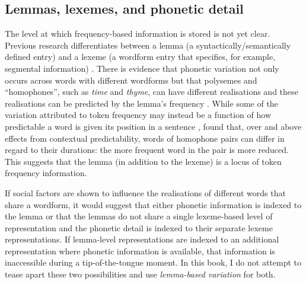 	\subsection{Lemmas, lexemes, and phonetic detail}
	
The level at which frequency-based information is stored is not yet clear. Previous research differentiates between a lemma (a syntactically/semantically defined entry) and a lexeme (a wordform entry that specifies, for example, segmental information) \citep{bock1995}. There is evidence that phonetic variation not only occurs across words with different wordforms but that polysemes and ``homophones'', such as \textit{time} and \textit{thyme}, can have different realisations and these realisations can be predicted by the lemma's frequency \citep{gahl-thyme,jurafskyetal2002}. While some of the variation attributed to token frequency may instead be a function of how predictable a word is given its position in a sentence \citep{jurafskyetal2002}, \citet{gahl-thyme} found that, over and above effects from contextual predictability, words of homophone pairs can differ in regard to their durations: the more frequent word in the pair is more reduced. This suggests that the lemma (in addition to the lexeme) is a locus of token frequency information. 

If social factors are shown to influence the realisations of different words that share a wordform, it would suggest that either phonetic information is indexed to the lemma or that the lemmas do not share a single lexeme-based level of representation and the phonetic detail is indexed to their separate lexeme representations. If lemma-level representations are indexed to an additional representation where phonetic information is available, that information is inaccessible during a tip-of-the-tongue moment. \nocite{johnson1997}\nocite{pierrehumbert2001}\nocite{pierrehumbert2006} In this book, I do not attempt to tease apart these two possibilities and use \textit{lemma-based variation} for both.

							

